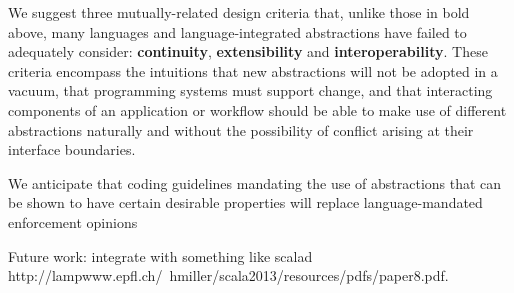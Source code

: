 \documentclass[9pt,preprint]{sigplanconf}
\begin{document}
We suggest three mutually-related {design criteria} that, unlike those in bold above, many languages and language-integrated abstractions have failed to adequately consider: \textbf{continuity}, \textbf{extensibility} and \textbf{interoperability}. These criteria encompass the intuitions that new abstractions will not be adopted in a vacuum, that programming systems must  support change, and that interacting components of an application or workflow should be able to make use of different abstractions naturally and without the possibility of conflict arising at their interface boundaries.


 We anticipate that coding guidelines mandating the use of abstractions that can be shown to have certain desirable properties will replace language-mandated enforcement opinions 
 
 Future work: integrate with something like scalad http://lampwww.epfl.ch/~hmiller/scala2013/resources/pdfs/paper8.pdf. 







\end{document}
